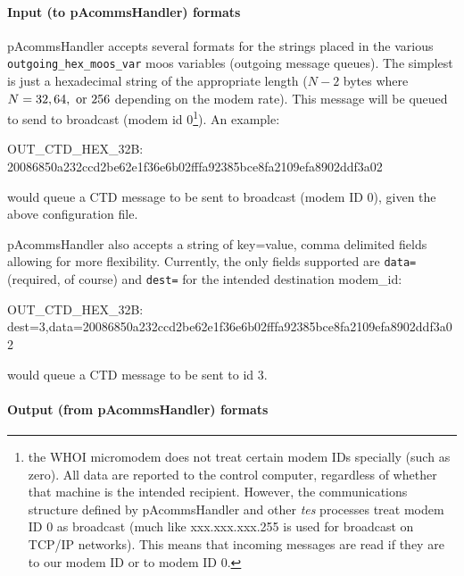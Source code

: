 \documentclass[11pt, letterpaper, oneside]{memoir}
\begin{document}
\begin{itemize}
\paragraph{Input (to pAcommsHandler) formats}\label{inputformat}

pAcommsHandler accepts several formats for the strings placed in the
various \verb|outgoing_hex_moos_var| moos variables (outgoing message queues). The
simplest is just a hexadecimal string of the appropriate length ($N-2$
bytes where $N=32, 64, \hbox{ or } 256$ depending on the modem
rate). This message will be queued to send to broadcast (modem id
0\footnote{the WHOI micromodem does not treat certain modem IDs
  specially (such as zero). All data are reported to the control
  computer, regardless of whether that machine is the intended
  recipient. However, the communications structure defined by
  pAcommsHandler and other \textit{tes} processes treat modem ID 0 as
  broadcast (much like xxx.xxx.xxx.255 is used for broadcast on TCP/IP
  networks). This means that incoming messages are read if they are to
  our modem ID or to modem ID 0.}). An example:
\begin{boxedverbatim}
OUT_CTD_HEX_32B: 20086850a232ccd2be62e1f36e6b02fffa92385bce8fa2109efa8902ddf3a02
\end{boxedverbatim}
\resetbvlinenumber
would queue a CTD message to be sent to broadcast (modem ID 0), given the above configuration file.

pAcommsHandler also accepts a string of key=value, comma delimited
fields allowing for more flexibility. Currently, the only fields
supported are \verb|data=| (required, of course) and \verb|dest=|
for the intended destination modem\_id:
\begin{boxedverbatim}
OUT_CTD_HEX_32B: dest=3,data=20086850a232ccd2be62e1f36e6b02fffa92385bce8fa2109efa8902ddf3a02
\end{boxedverbatim}
\resetbvlinenumber
would queue a CTD message to be sent to id 3.


\paragraph{Output (from pAcommsHandler) formats} 


\end{itemize}
\end{document}
